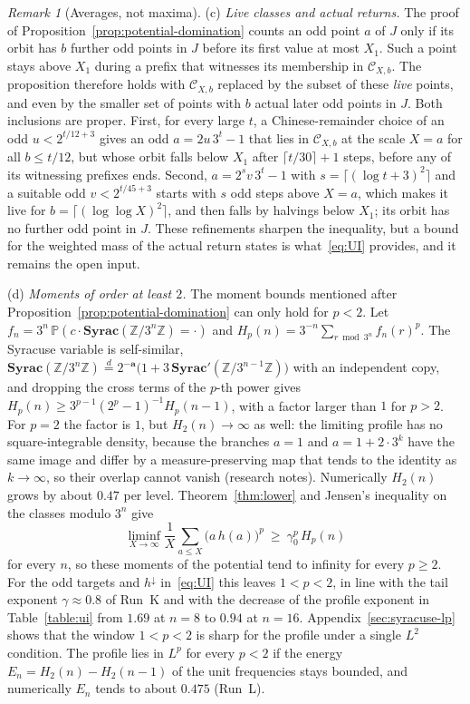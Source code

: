 \documentclass[12pt]{amsart}
\theoremstyle{definition}
\theoremstyle{remark}
\newtheorem{remark}{Remark}
\begin{document}
\begin{remark}[Averages, not maxima]
(c) \emph{Live classes and actual returns.} The proof of Proposition~\ref{prop:potential-domination} counts an odd point $a$ of $J$ only if its orbit has $b$ further odd points in $J$ before its first value at most $X_1$. Such a point stays above $X_1$ during a prefix that witnesses its membership in $\mathcal C_{X,b}$. The proposition therefore holds with $\mathcal C_{X,b}$ replaced by the subset of these \emph{live} points, and even by the smaller set of points with $b$ actual later odd points in $J$. Both inclusions are proper. First, for every large $t$, a Chinese-remainder choice of an odd $u<2^{t/12+3}$ gives an odd $a=2u\,3^t-1$ that lies in $\mathcal C_{X,b}$ at the scale $X=a$ for all $b\le t/12$, but whose orbit falls below $X_1$ after $\lceil t/30\rceil+1$ steps, before any of its witnessing prefixes ends. Second, $a=2^sv\,3^t-1$ with $s=\lceil(\log t+3)^2\rceil$ and a suitable odd $v<2^{t/45+3}$ starts with $s$ odd steps above $X=a$, which makes it live for $b=\lceil(\log\log X)^2\rceil$, and then falls by halvings below $X_1$; its orbit has no further odd point in $J$. These refinements sharpen the inequality, but a bound for the weighted mass of the actual return states is what~\eqref{eq:UI} provides, and it remains the open input.

(d) \emph{Moments of order at least $2$.} The moment bounds mentioned after Proposition~\ref{prop:potential-domination} can only hold for $p<2$. Let $f_n=3^n\,\mathbb P(c\cdot\mathbf{Syrac}(\mathbb Z/3^n\mathbb Z)=\cdot)$ and $H_p(n)=3^{-n}\sum_{r\bmod3^n}f_n(r)^p$. The Syracuse variable is self-similar, $\mathbf{Syrac}(\mathbb Z/3^n\mathbb Z)\overset d=2^{-\mathbf a}\bigl(1+3\,\mathbf{Syrac}'(\mathbb Z/3^{n-1}\mathbb Z)\bigr)$ with an independent copy, and dropping the cross terms of the $p$-th power gives $H_p(n)\ge3^{p-1}(2^p-1)^{-1}H_p(n-1)$, with a factor larger than $1$ for $p>2$. For $p=2$ the factor is $1$, but $H_2(n)\to\infty$ as well: the limiting profile has no square-integrable density, because the branches $a=1$ and $a=1+2\cdot3^k$ have the same image and differ by a measure-preserving map that tends to the identity as $k\to\infty$, so their overlap cannot vanish (research notes). Numerically $H_2(n)$ grows by about $0.47$ per level. Theorem~\ref{thm:lower} and Jensen's inequality on the classes modulo $3^n$ give
\[
 \liminf_{X\to\infty}\frac1X\sum_{a\le X}\bigl(a\,h(a)\bigr)^p\ \ge\ \gamma_0^p\,H_p(n)
\]
for every $n$, so these moments of the potential tend to infinity for every $p\ge2$. For the odd targets and $h^\downarrow$ in~\eqref{eq:UI} this leaves $1<p<2$, in line with the tail exponent $\gamma\approx0.8$ of Run~K and with the decrease of the profile exponent in Table~\ref{table:ui} from $1.69$ at $n=8$ to $0.94$ at $n=16$. Appendix~\ref{sec:syracuse-lp} shows that the window $1<p<2$ is sharp for the profile under a single $L^2$ condition. The profile lies in $L^p$ for every $p<2$ if the energy $E_n=H_2(n)-H_2(n-1)$ of the unit frequencies stays bounded, and numerically $E_n$ tends to about $0.475$ (Run~L).
\end{remark}
\end{document}
